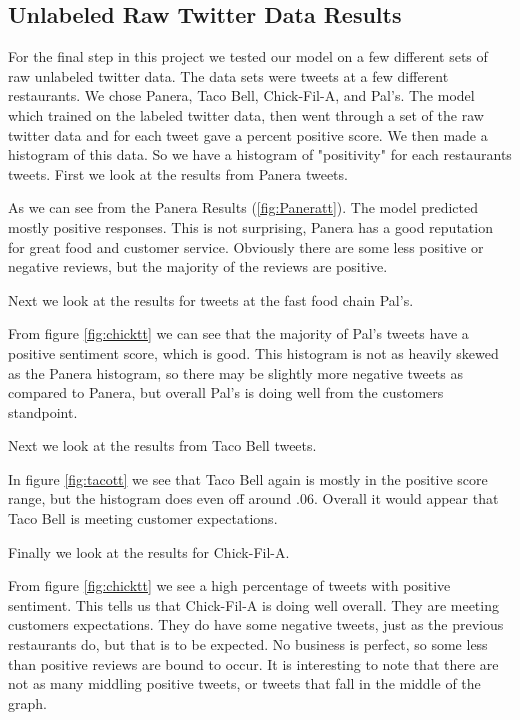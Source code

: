 \documentclass[titlepage,letterpaper]{article}
\begin{document}
\subsection{Unlabeled Raw Twitter Data Results}



For the final step in this project we tested our model on a few different sets of raw unlabeled twitter data. The data sets were tweets at a few different restaurants. We chose Panera, Taco Bell, Chick-Fil-A, and Pal's. The model which trained on the labeled twitter data, then went through a set of the raw twitter data and for each tweet gave a percent positive score. We then made a histogram of this data. So we have a histogram of "positivity" for each restaurants tweets. First we look at the results from Panera tweets. 



As we can see from the Panera Results (\cref{fig:Paneratt}). The model predicted mostly positive responses. This is not surprising, Panera has a good reputation for great food and customer service. Obviously there are some less positive or negative reviews, but the majority of the reviews are positive.

Next we look at the results for tweets at the fast food chain Pal's.



From figure \cref{fig:chicktt} we can see that the majority of Pal's tweets have a positive sentiment score, which is good. This histogram is not as heavily skewed as the Panera histogram, so there may be slightly more negative tweets as compared to Panera, but overall Pal's is doing well from the customers standpoint. 

Next we look at the results from Taco Bell tweets.



In figure \cref{fig:tacott} we see that Taco Bell again is mostly in the positive score range, but the histogram does even off around $.06$. Overall it would appear that Taco Bell is meeting customer expectations. 

Finally we look at the results for Chick-Fil-A.


%

From figure \cref{fig:chicktt} we see a high percentage of tweets with positive sentiment. This tells us that Chick-Fil-A is doing well overall. They are meeting customers expectations. They do have some negative tweets, just as the previous restaurants do, but that is to be expected. No business is perfect, so some less than positive reviews are bound to occur. It is interesting to note that there are not as many middling positive tweets, or tweets that fall in the middle of the graph.
\end{document}
